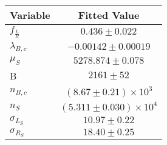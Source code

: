 \begin{tabular}[t]{lc}
\hline
Variable &Fitted Value\\
\hline\hline
$f_{\frac{L}{R}}$&$0.436\pm0.022$\\
\hline
$\lambda_{B,c}$&$-0.00142\pm0.00019$\\
\hline
$\mu_S$&$5278.874\pm0.078$\\
\hline
B&$2161\pm52$\\
\hline
$n_{B,c}$&$(8.67\pm0.21)\times 10^3$\\
\hline
$n_S$&$(5.311\pm0.030)\times 10^4$\\
\hline
$\sigma_{L_S}$&$10.97\pm0.22$\\
\hline
$\sigma_{R_S}$&$18.40\pm0.25$\\
\hline
\end{tabular}